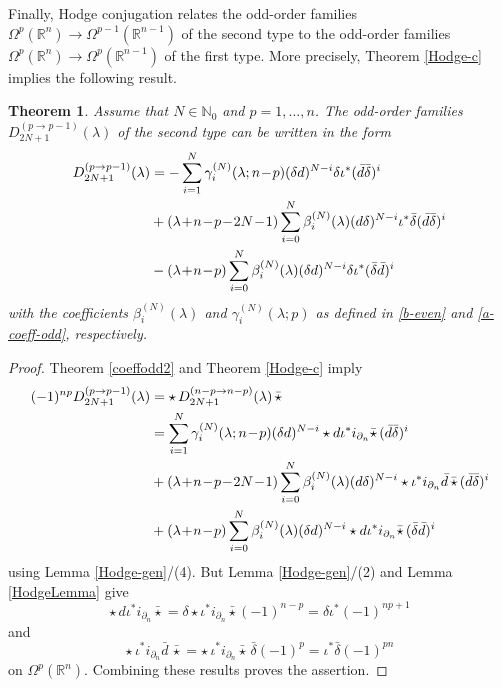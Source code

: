 \documentclass[a4paper,12pt,reqno]{amsart}
\newtheorem{theorem}{Theorem}
\numberwithin{theorem}{subsection}
\numberwithin{equation}{section}
\begin{document}
Finally, Hodge conjugation relates the odd-order families $\Omega^p({\mathbb{R}}^n) \to
\Omega^{p-1}({\mathbb{R}}^{n-1})$ of the second type to the odd-order families
$\Omega^p({\mathbb{R}}^n) \to \Omega^{p}({\mathbb{R}}^{n-1})$ of the first type. More precisely,
Theorem \ref{Hodge-c} implies the following result.

\begin{theorem}\label{coeffodd} Assume that $N \in {\mathbb{N}}_0$ and $p=1,\dots,n$.
The odd-order families $D^{(p \to p-1)}_{2N+1}(\lambda)$ of the second type can
be written in the form
\begin{align}\label{SBO-odd}
   D^{(p \to p-1)}_{2N+1}(\lambda)
   & = - \sum_{i=1}^N \gamma_i^{(N)}(\lambda;n\!-\!p)
   (\delta {d})^{N-i} \delta \iota^* (\bar{d} \bar{\delta})^i \notag \\
   & + (\lambda\!+\!n\!-\!p\!-\!2N\!-\!1) \sum_{i=0}^N \beta_i^{(N)} (\lambda)
   ({d} \delta)^{N-i} \iota^* \bar{\delta} (\bar{d} \bar{\delta})^i \notag \\
   & - (\lambda\!+\!n\!-\!p) \sum_{i=0}^N \beta_i^{(N)}(\lambda)
   (\delta {d})^{N-i} \delta \iota^* (\bar{\delta} \bar{d})^i
\end{align}
with the coefficients $\beta_i^{(N)}(\lambda)$ and $\gamma_i^{(N)}(\lambda;p)$
as defined in \eqref{b-even} and \eqref{a-coeff-odd}, respectively.
\end{theorem}

\begin{proof} Theorem \ref{coeffodd2} and Theorem \ref{Hodge-c} imply
\begin{align*}
   (-1)^{np} D_{2N+1}^{(p \to p-1)}(\lambda) & = \star \, D_{2N+1}^{(n-p \to n-p)}(\lambda) \, \bar{\star} \\
   & = \sum_{i=1}^N \gamma_i^{(N)}(\lambda;n\!-\!p)
   (\delta {d})^{N-i} \star {d} \iota^* i_{\partial_n} \bar{\star} \, (\bar{d} \bar{\delta})^i \notag \\
   & + (\lambda\!+\!n\!-\!p\!-\!2N\!-\!1) \sum_{i=0}^N \beta_i^{(N)} (\lambda)
   ({d} \delta)^{N-i} \star \iota^* i_{\partial_n} \bar{d} \, \bar{\star} \,(\bar{d} \bar{\delta})^i \notag \\
   & + (\lambda\!+\!n\!-\!p) \sum_{i=0}^N \beta_i^{(N)}(\lambda)
   (\delta {d})^{N-i} \star {d} \iota^* i_{\partial_n} \bar{\star} \, (\bar{\delta} \bar{d})^i
\end{align*}
using Lemma \ref{Hodge-gen}/(4). But Lemma \ref{Hodge-gen}/(2) and Lemma
\ref{HodgeLemma} give
\begin{equation*}
   \star \, {d} \iota^* i_{\partial_n} \bar{\star} = \delta \star \iota^* i_{\partial_n} \bar{\star} (-1)^{n-p}
   = \delta \iota^* (-1)^{np+1}
\end{equation*}
and
\begin{equation*}
   \star \, \iota^* i_{\partial_n} \bar{d} \, \bar{\star} = \star \,
   \iota^* i_{\partial_n} \bar{\star} \, \bar{\delta} (-1)^p = \iota^* \bar{\delta} (-1)^{pn}
\end{equation*}
on $\Omega^p({\mathbb{R}}^n)$. Combining these results proves the assertion.
\end{proof}
\end{document}
